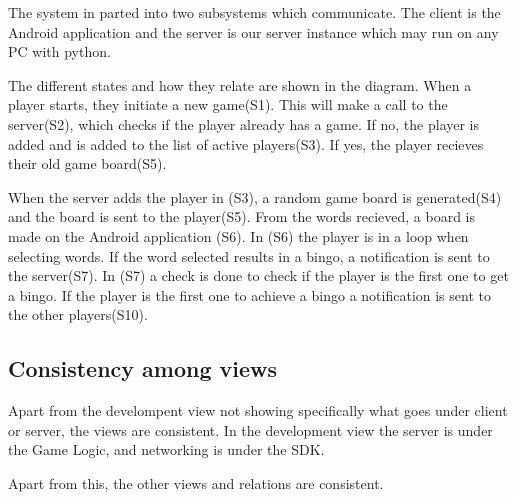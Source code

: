 The system in parted into two subsystems which communicate. The client is the Android application and the server is our server instance which may run on any PC with python. 

The different states and how they relate are shown in the diagram. 
When a player starts, they initiate a new game(S1). This will make a call to the server(S2), which checks if the player already has a game. If no, the player is added and is added to the list of active players(S3). If yes, the player recieves their old game board(S5). 

When the server adds the player in (S3), a random game board is generated(S4) and the board is sent to the player(S5).
From the words recieved, a board is made on the Android application (S6). In (S6) the player is in a loop when selecting words. If the word selected results in a bingo, a notification is sent to the server(S7). In (S7) a check is done to check if the player is the first one to get a bingo. If the player is the first one to achieve a bingo a notification is sent to the other players(S10).

\subsection{Consistency among views} 
\label{sec:consistencyamongviews}

Apart from the develompent view not showing specifically what goes under client
or server, the views are consistent. In the development view the server is
under the Game Logic, and networking is under the SDK\@.

Apart from this, the other views and relations are consistent.
